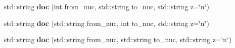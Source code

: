 \begin{Indent}
\begin{DoxyCompactItemize}
\mbox{\label{namespacepyne_1_1rxname_a9820e3543688dcdf357499919edd7f7c}} 
std\+::string {\bfseries doc} (int from\+\_\+nuc, std\+::string to\+\_\+nuc, std\+::string z=\char`\"{}n\char`\"{})
\item 
\mbox{\label{namespacepyne_1_1rxname_a9b097eed11efda815806880622391f7f}} 
std\+::string {\bfseries doc} (std\+::string from\+\_\+nuc, int to\+\_\+nuc, std\+::string z=\char`\"{}n\char`\"{})
\item 
\mbox{\label{namespacepyne_1_1rxname_a4b8d25c68ceee23acdac2a537d2b951a}} 
std\+::string {\bfseries doc} (std\+::string from\+\_\+nuc, std\+::string to\+\_\+nuc, std\+::string z=\char`\"{}n\char`\"{})
\end{DoxyCompactItemize}
\end{Indent}
